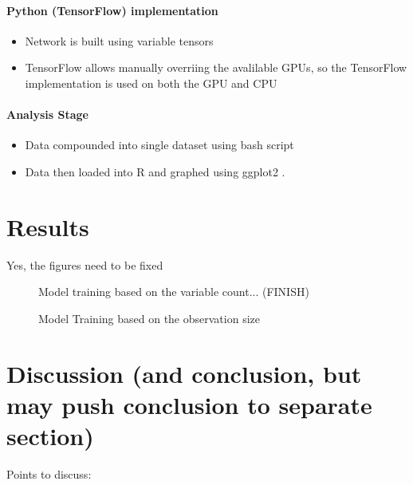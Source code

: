\documentclass[12pt]{article}
\begin{document}
\paragraph{Python (TensorFlow) implementation}

\begin{itemize}
	\item Network is built using variable tensors
	\item TensorFlow allows manually overriing the avalilable GPUs, so the TensorFlow implementation is used on both the GPU and CPU
\end{itemize}


\paragraph{Analysis Stage}


\begin{itemize}
	\item Data compounded into single dataset using bash script
	\item Data then loaded into R \cite{lang_r} and graphed using ggplot2 \cite{lib_ggplot2}.
\end{itemize}

\section{Results}

Yes, the figures need to be fixed

\begin{figure}
	\begin{center}
		
	\end{center}
	\caption{Model training based on the variable count... (FINISH)}
\end{figure}

\begin{figure}
	\begin{center}
		
	\end{center}
	\caption{Model Training based on the observation size}
\end{figure}

\section{Discussion (and conclusion, but may push conclusion to separate section)}

Points to discuss:
\end{document}
